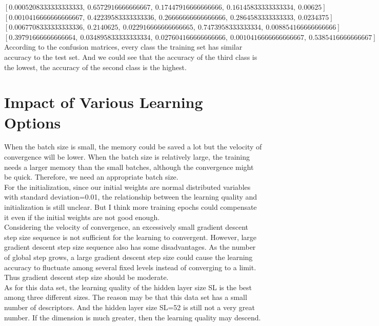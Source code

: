 \documentclass{article}
\begin{document}
$[0.0005208333333333333,\ 0.6572916666666667,\ 0.17447916666666666,\ 0.16145833333333334,\ 0.00625]$\\
$[0.0010416666666666667,\ 0.42239583333333336,\ 0.26666666666666666,\ 0.2864583333333333,\ 0.0234375]$\\ $[0.0067708333333333336,\ 0.2140625,\ 0.022916666666666665,\ 0.7473958333333334,\ 0.008854166666666666]$\\ $[0.39791666666666664,\ 0.034895833333333334,\ 0.027604166666666666,\ 0.0010416666666666667,\ 0.5385416666666667]$\\
According to the confusion matrices, every class the training set has similar accuracy to the test set. And we could see that the accuracy of the third class is the lowest, the accuracy of the second class is the highest.
\section{Impact of Various Learning Options}
When the batch size is small, the memory could be saved a lot but the velocity of convergence will be lower. When the batch size is relatively large, the training needs a larger memory than the small batches, although the convergence might be quick. Therefore, we need an appropriate batch size.\\
For the initialization, since our initial weights are normal distributed variables with standard deviation=0.01, the relationship between the learning quality and initialization is still unclear. But I think more training epochs could compensate it even if the initial weights are not good enough.\\
Considering the velocity of convergence, an excessively small gradient descent step size sequence is not sufficient for the learning to convergent. However, large gradient descent step size sequence also has some disadvantages. As the number of global step grows, a large gradient descent step size could cause the learning accuracy to fluctuate among several fixed levels instead of converging to a limit. Thus gradient descent step size should be moderate.\\
As for this data set, the learning quality of the hidden layer size SL is the best among three different sizes. The reason may be that this data set has a small number of descriptors. And the hidden layer size SL=52 is still not a very great number. If the dimension is much greater, then the learning quality may descend.\\
\end{document}
